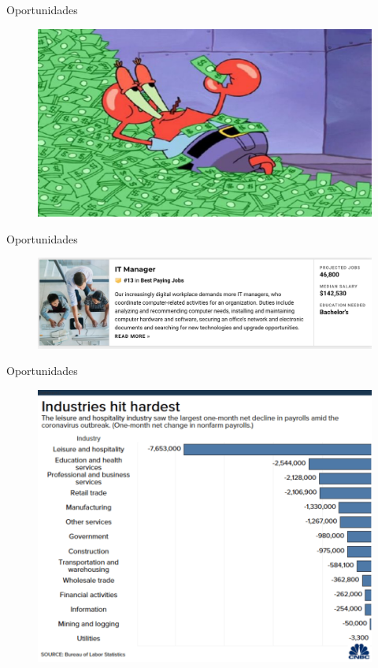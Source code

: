 \documentclass[aspectratio=169]{beamer}
\begin{document}
\begin{frame}{Oportunidades}

            \begin{figure}
                \centering
                \includegraphics[width=\linewidth]{Images/cangrejo}
            \end{figure}
\end{frame}

\begin{frame}{Oportunidades}

            \begin{figure}
                \centering
                \includegraphics[width=\linewidth]{Images/trabajo}
            \end{figure}
\end{frame}

\begin{frame}{Oportunidades}

            \begin{figure}
                \centering
                \includegraphics[width=0.7\linewidth]{Images/jobs}
            \end{figure}
\end{frame}
\end{document}
